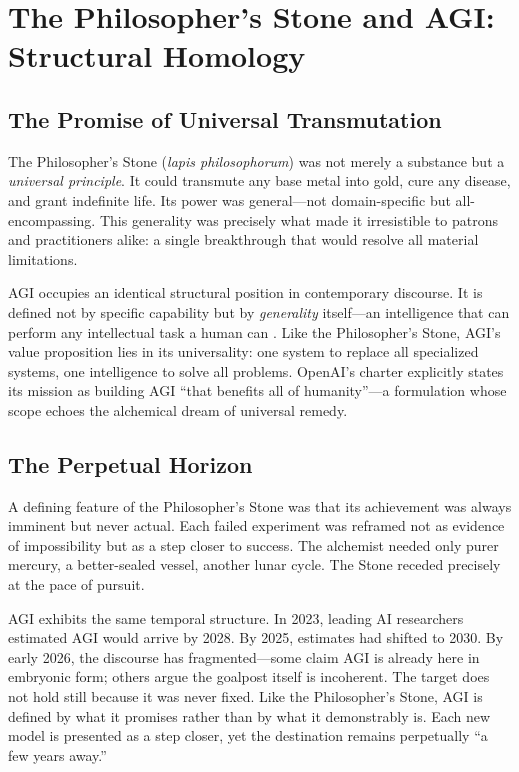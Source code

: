 \documentclass[12pt]{article}
\begin{document}
\section{The Philosopher's Stone and AGI: Structural Homology}
\label{sec:homology}

\subsection{The Promise of Universal Transmutation}
\label{sec:promise}

The Philosopher's Stone (\emph{lapis philosophorum}) was not merely a substance but a \emph{universal principle}. It could transmute any base metal into gold, cure any disease, and grant indefinite life. Its power was general---not domain-specific but all-encompassing. This generality was precisely what made it irresistible to patrons and practitioners alike: a single breakthrough that would resolve all material limitations.

AGI occupies an identical structural position in contemporary discourse. It is defined not by specific capability but by \emph{generality} itself---an intelligence that can perform any intellectual task a human can \citep{goertzel2007}. Like the Philosopher's Stone, AGI's value proposition lies in its universality: one system to replace all specialized systems, one intelligence to solve all problems. OpenAI's charter explicitly states its mission as building AGI ``that benefits all of humanity''---a formulation whose scope echoes the alchemical dream of universal remedy.

\subsection{The Perpetual Horizon}
\label{sec:horizon}

A defining feature of the Philosopher's Stone was that its achievement was always imminent but never actual. Each failed experiment was reframed not as evidence of impossibility but as a step closer to success. The alchemist needed only purer mercury, a better-sealed vessel, another lunar cycle. The Stone receded precisely at the pace of pursuit.

AGI exhibits the same temporal structure. In 2023, leading AI researchers estimated AGI would arrive by 2028. By 2025, estimates had shifted to 2030. By early 2026, the discourse has fragmented---some claim AGI is already here in embryonic form; others argue the goalpost itself is incoherent. The target does not hold still because it was never fixed. Like the Philosopher's Stone, AGI is defined by what it promises rather than by what it demonstrably is. Each new model is presented as a step closer, yet the destination remains perpetually ``a few years away.''
\end{document}
